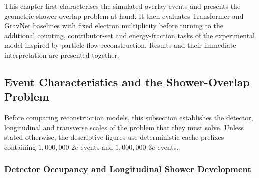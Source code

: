 
This chapter first characterises the simulated overlay events and presents the
geometric shower-overlap problem at hand. It then evaluates Transformer and GravNet
baselines with fixed electron multiplicity before turning to the additional
counting, contributor-set and energy-fraction tasks of the experimental model
inspired by particle-flow reconstruction. Results and their immediate
interpretation are presented together.

\subsection{Event Characteristics and the Shower-Overlap Problem}
\label{sec:results_event_characteristics}

Before comparing reconstruction models, this subsection establishes the
detector, longitudinal and transverse scales of the problem that they must
solve. Unless stated otherwise, the descriptive figures use deterministic
cache prefixes containing \(1{,}000{,}000\) \(2e\) events and
\(1{,}000{,}000\) \(3e\)
events. 


\subsubsection{Detector Occupancy and Longitudinal Shower Development}

